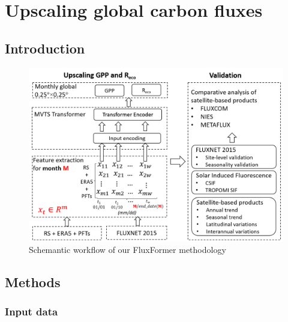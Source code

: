 \chapter{Upscaling global carbon fluxes}
\renewcommand{\headrulewidth}{0pt}
\lhead[\thepage]{\leftmark}
\rhead[\leftmark]{\thepage}
\cfoot[]{}

\section{Introduction}

\begin{figure}[tbh!]
    \centering
    \includegraphics[width=\textwidth]{figs/chap6/workflow.png}
    \caption[Schemantic workflow of our FluxFormer methodology]{Schemantic workflow of our FluxFormer methodology}
    \label{fig:chap6_fig1}
\end{figure}

\section{Methods}
\subsection{Input data}


